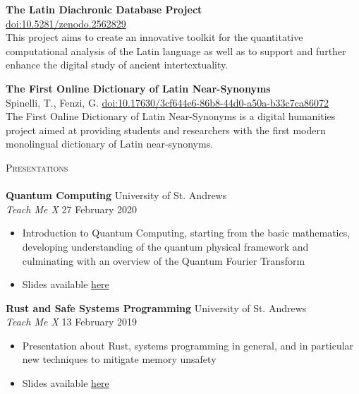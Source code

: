 \documentclass[a4paper]{article}
\newcommand{\lineunder} {
    \vspace*{-8pt} \\
    \hspace*{-18pt} \hrulefill \\
}
\newcommand{\header} [1] {
    {\hspace*{-18pt}\vspace*{6pt} \textsc{#1}}
    \vspace*{-6pt} \lineunder
}
\begin{document}
\vbox{
    {\textbf{The Latin Diachronic Database Project}}  \\
     \hfill  \href{https://zenodo.org/record/2562829}{doi:10.5281/zenodo.2562829} \\
    This project aims to create an innovative toolkit for the quantitative computational analysis of the Latin language as well as to support and further enhance the digital study of ancient intertextuality. \\
    \vspace*{2mm}
}

\vbox{
    {\textbf{The First Online Dictionary of Latin Near-Synonyms}} \\
    Spinelli, T., Fenzi, G. \hfill \href{https://risweb.st-andrews.ac.uk/portal/en/datasets/the-first-online-dictionary-of-latin-nearsynonyms(3cf644e6-86b8-44d0-a50a-b33c7ca86072).html}{doi:10.17630/3cf644e6-86b8-44d0-a50a-b33c7ca86072}\\
    The First Online Dictionary of Latin Near-Synonyms is a digital humanities project aimed at providing students and researchers with the first modern monolingual dictionary of Latin near-synonyms. \\
}

\header{Presentations}

\textbf{Quantum Computing} \hfill University of St. Andrews \\
\textit{Teach Me X} \hfill{27 February 2020}
\vspace{-1mm}
\begin{itemize} \itemsep 1pt
    \item Introduction to Quantum Computing, starting from the basic mathematics, developing understanding of the quantum physical framework
          and culminating with an overview of the Quantum Fourier Transform
    \item Slides available \href{https://github.com/WizardOfMenlo/QuantumPresentationTMX}{here}
\end{itemize}

\textbf{Rust and Safe Systems Programming} \hfill University of St. Andrews \\
\textit{Teach Me X} \hfill{13 February 2019}
\vspace{-1mm}
\begin{itemize} \itemsep 1pt
    \item Presentation about Rust, systems programming in general, and in particular new techniques to mitigate memory unsafety
    \item Slides available \href{https://docs.google.com/presentation/d/1ui4ByY8qFhqAsdYoyPBPzhyg8AbV5YJKAN9sNwv5QPw/edit?usp=sharing}{here}
\end{itemize}
\end{document}
